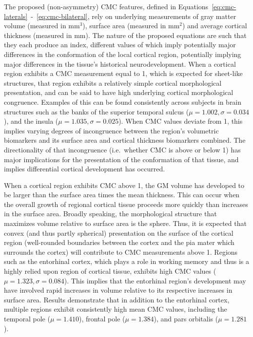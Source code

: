 \documentclass{article}
\newcommand{\CMC}{\(\text{CMC}\) }
\begin{document}
The proposed (non-asymmetry) \CMC features, defined in
Equations~\ref{eq:cmc-laterals}~-~\ref{eq:cmc-bilateral}, rely on underlying
measurements of gray matter volume (measured in mm\(^3\)), surface area
(measured in mm\(^2\)) and average cortical thickness (measured in mm). The
nature of the proposed equations are such that they each produce an index,
different values of which imply potentially major differences in the
conformation of the local cortical region, potentially implying major
differences in the tissue's historical neurodevelopment. When a cortical
region exhibits a \CMC measurement equal to 1, which is expected for
sheet-like structures, that region exhibits a relatively simple cortical
morphological presentation, and can be said to have high underlying cortical
morphological congruence. Examples of this can be found consistently across
subjects in brain structures such as the banks of the superior temporal
sulcus (\(\mu=1.002, \sigma=0.034\)), and the insula
(\(\mu=1.035, \sigma=0.025\)). When \CMC values deviate from
1, this implies varying degrees of incongruence between the region's
volumetric biomarkers and its surface area and cortical thickness biomarkers
combined. The directionality of that incongruence (i.e.\ whether \CMC is above
or below 1) has major implications for the presentation of the conformation
of that tissue, and implies differential cortical development has occurred.

When a cortical region exhibits \CMC above 1, the GM volume has developed to
be larger than the surface area times the mean thickness. This can occur when
the overall growth of regional cortical tissue proceeds more quickly than
increases in the surface area. Broadly speaking, the morphological structure
that maximizes volume relative to surface area is the sphere. Thus, it is
expected that convex (and thus partly spherical) presentation on the surface
of the cortical region (well-rounded boundaries between the cortex and the
pia mater which surrounds the cortex) will contribute to CMC measurements
above 1. Regions such as the entorhinal cortex, which plays a role in working
memory and thus is a highly relied upon region of cortical tissue, exhibits
high CMC values (\(\mu=1.323, \sigma=0.084\)). This implies that the
entorhinal region's development may have involved rapid increases in volume
relative to its respective increases in surface area. Results demonstrate
that in addition to the entorhinal cortex, multiple regions exhibit
consistently high mean \CMC values, including the temporal pole
(\(\mu=1.410\)), frontal pole (\(\mu=1.384\)), and pars orbitalis
(\(\mu=1.281\)).
\end{document}
